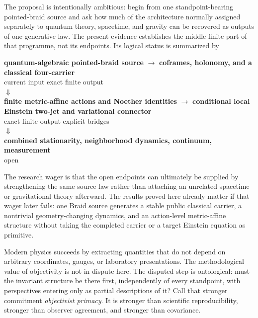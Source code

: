 \documentclass[11pt]{article}
\theoremstyle{definition}
\theoremstyle{remark}
\begin{document}
The proposal is intentionally ambitious: begin from one standpoint-bearing pointed-braid source and ask how much of the architecture normally assigned separately to quantum theory, spacetime, and gravity can be recovered as outputs of one generative law. The present evidence establishes the middle finite part of that programme, not its endpoints. Its logical status is summarized by
\begin{center}
\begin{minipage}{0.96\linewidth}
\centering
\small
\textbf{quantum-algebraic pointed-braid source}
$\longrightarrow$
\textbf{coframes, holonomy, and a classical four-carrier}\\[-0.15em]
{\footnotesize current input \hspace{16em} exact finite output}\\[0.25em]
$\Downarrow$\\[-0.1em]
\textbf{finite metric-affine actions and Noether identities}
$\longrightarrow$
\textbf{conditional local Einstein two-jet and variational connector}\\[-0.15em]
{\footnotesize exact finite output \hspace{6em} explicit bridges}\\[0.25em]
$\Downarrow$\\[-0.1em]
\textbf{combined stationarity, neighborhood dynamics, continuum, measurement}\\[-0.15em]
{\footnotesize open}
\end{minipage}
\end{center}
The research wager is that the open endpoints can ultimately be supplied by strengthening the same source law rather than attaching an unrelated spacetime or gravitational theory afterward. The results proved here already matter if that wager later fails: one Braid source generates a stable public classical carrier, a nontrivial geometry-changing dynamics, and an action-level metric-affine structure without taking the completed carrier or a target Einstein equation as primitive.

Modern physics succeeds by extracting quantities that do not depend on arbitrary coordinates, gauges, or laboratory presentations. The methodological value of objectivity is not in dispute here. The disputed step is ontological: must the invariant structure be there first, independently of every standpoint, with perspectives entering only as partial descriptions of it? Call that stronger commitment \emph{objectivist primacy}. It is stronger than scientific reproducibility, stronger than observer agreement, and stronger than covariance.
\end{document}
